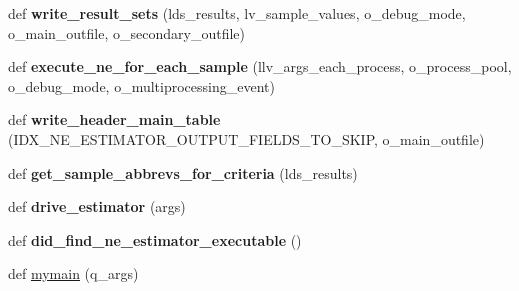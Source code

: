 \begin{DoxyCompactItemize}
\item 
def {\bfseries write\+\_\+result\+\_\+sets} (lds\+\_\+results, lv\+\_\+sample\+\_\+values, o\+\_\+debug\+\_\+mode, o\+\_\+main\+\_\+outfile, o\+\_\+secondary\+\_\+outfile)\hypertarget{namespacenegui_1_1pgdriveneestimator_aa45ae8154c350b0a30ba8c1037bfd445}{}\label{namespacenegui_1_1pgdriveneestimator_aa45ae8154c350b0a30ba8c1037bfd445}

\item 
def {\bfseries execute\+\_\+ne\+\_\+for\+\_\+each\+\_\+sample} (llv\+\_\+args\+\_\+each\+\_\+process, o\+\_\+process\+\_\+pool, o\+\_\+debug\+\_\+mode, o\+\_\+multiprocessing\+\_\+event)\hypertarget{namespacenegui_1_1pgdriveneestimator_aefaaafaa951edf46424dfc57535046a7}{}\label{namespacenegui_1_1pgdriveneestimator_aefaaafaa951edf46424dfc57535046a7}

\item 
def {\bfseries write\+\_\+header\+\_\+main\+\_\+table} (I\+D\+X\+\_\+\+N\+E\+\_\+\+E\+S\+T\+I\+M\+A\+T\+O\+R\+\_\+\+O\+U\+T\+P\+U\+T\+\_\+\+F\+I\+E\+L\+D\+S\+\_\+\+T\+O\+\_\+\+S\+K\+IP, o\+\_\+main\+\_\+outfile)\hypertarget{namespacenegui_1_1pgdriveneestimator_adffb79ac878373773c2927935685788d}{}\label{namespacenegui_1_1pgdriveneestimator_adffb79ac878373773c2927935685788d}

\item 
def {\bfseries get\+\_\+sample\+\_\+abbrevs\+\_\+for\+\_\+criteria} (lds\+\_\+results)\hypertarget{namespacenegui_1_1pgdriveneestimator_a0f1e4581a5ef4ce1eb077c445856ed8f}{}\label{namespacenegui_1_1pgdriveneestimator_a0f1e4581a5ef4ce1eb077c445856ed8f}

\item 
def {\bfseries drive\+\_\+estimator} (args)\hypertarget{namespacenegui_1_1pgdriveneestimator_a688d7a2f0a11f0225a5f95d7403d771e}{}\label{namespacenegui_1_1pgdriveneestimator_a688d7a2f0a11f0225a5f95d7403d771e}

\item 
def {\bfseries did\+\_\+find\+\_\+ne\+\_\+estimator\+\_\+executable} ()\hypertarget{namespacenegui_1_1pgdriveneestimator_acd20398ef9d21132f19d1c0e564b25b9}{}\label{namespacenegui_1_1pgdriveneestimator_acd20398ef9d21132f19d1c0e564b25b9}

\item 
def \hyperlink{namespacenegui_1_1pgdriveneestimator_a9195d73a2642b87625772820ffff8023}{mymain} (q\+\_\+args)
\end{DoxyCompactItemize}
